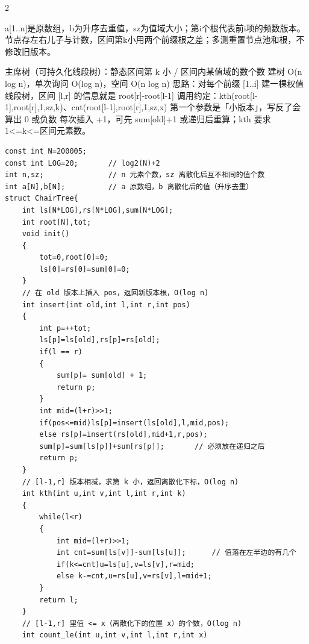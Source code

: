 \documentclass[UTF8,fontset=fandol,a4paper,twoside]{ctexart}
\newcommand{\note}[1]{{\fontsize{10}{12}\selectfont #1\par}}
\begin{document}
\begin{multicols}{2}
\note{a[\allowbreak{}1.\allowbreak{}.\allowbreak{}n]\allowbreak{}是原数组，b为升序去重值，sz为值域大小；第i个根代表前i项的频数版本。节点存左右儿子与计数，区间第k小用两个前缀根之差；多测重置节点池和根，不修改旧版本。}
\note{主席树（可持久化线段树）：静态区间第 k 小 /\allowbreak{} 区间内某值域的数个数 建树 O(\allowbreak{}n log n)\allowbreak{}，单次询问 O(\allowbreak{}log n)\allowbreak{}，空间 O(\allowbreak{}n log n)\allowbreak{} 思路：对每个前缀 [\allowbreak{}1.\allowbreak{}.\allowbreak{}i]\allowbreak{} 建一棵权值线段树，区间 [\allowbreak{}l,\allowbreak{}r]\allowbreak{} 的信息就是 root[\allowbreak{}r]\allowbreak{}-\allowbreak{}root[\allowbreak{}l-\allowbreak{}1]\allowbreak{} 调用约定：kth(\allowbreak{}root[\allowbreak{}l-\allowbreak{}1]\allowbreak{},\allowbreak{}root[\allowbreak{}r]\allowbreak{},\allowbreak{}1,\allowbreak{}sz,\allowbreak{}k)\allowbreak{}、cnt(\allowbreak{}root[\allowbreak{}l-\allowbreak{}1]\allowbreak{},\allowbreak{}root[\allowbreak{}r]\allowbreak{},\allowbreak{}1,\allowbreak{}sz,\allowbreak{}x)\allowbreak{} 第一个参数是「小版本」，写反了会算出 0 或负数 每次插入 +\allowbreak{}1，可先 sum[\allowbreak{}old]\allowbreak{}+\allowbreak{}1 或递归后重算；kth 要求 1<\allowbreak{}=\allowbreak{}k<\allowbreak{}=\allowbreak{}区间元素数。}
\begin{lstlisting}
const int N=200005;
const int LOG=20;       // log2(N)+2
int n,sz;               // n 元素个数，sz 离散化后互不相同的值个数
int a[N],b[N];          // a 原数组，b 离散化后的值（升序去重）
struct ChairTree{
    int ls[N*LOG],rs[N*LOG],sum[N*LOG];
    int root[N],tot;
    void init()
    {
        tot=0,root[0]=0;
        ls[0]=rs[0]=sum[0]=0;
    }
    // 在 old 版本上插入 pos，返回新版本根，O(log n)
    int insert(int old,int l,int r,int pos)
    {
        int p=++tot;
        ls[p]=ls[old],rs[p]=rs[old];
        if(l == r)
        {
            sum[p]= sum[old] + 1;
            return p;
        }
        int mid=(l+r)>>1;
        if(pos<=mid)ls[p]=insert(ls[old],l,mid,pos);
        else rs[p]=insert(rs[old],mid+1,r,pos);
        sum[p]=sum[ls[p]]+sum[rs[p]];       // 必须放在递归之后
        return p;
    }
    // [l-1,r] 版本相减，求第 k 小，返回离散化下标，O(log n)
    int kth(int u,int v,int l,int r,int k)
    {
        while(l<r)
        {
            int mid=(l+r)>>1;
            int cnt=sum[ls[v]]-sum[ls[u]];      // 值落在左半边的有几个
            if(k<=cnt)u=ls[u],v=ls[v],r=mid;
            else k-=cnt,u=rs[u],v=rs[v],l=mid+1;
        }
        return l;
    }
    // [l-1,r] 里值 <= x（离散化下的位置 x）的个数，O(log n)
    int count_le(int u,int v,int l,int r,int x)

\end{lstlisting}
\end{multicols}
\end{document}
